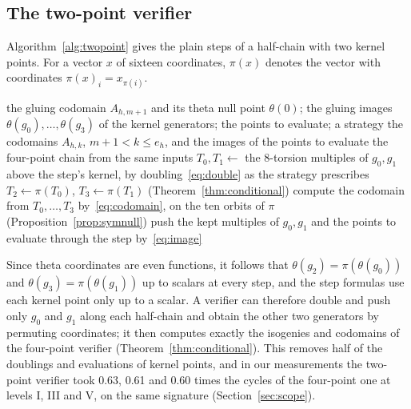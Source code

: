 \documentclass[version=preprint]{iacrcc}
\begin{document}
    \subsection{The two-point verifier}
    \label{sec:twopoint-alg}
    Algorithm~\ref{alg:twopoint} gives the plain steps of a half-chain with
    two kernel points. For a vector $x$ of sixteen coordinates, $\pi(x)$
    denotes the vector with coordinates $\pi(x)_i = x_{\pi(i)}$.

    \begin{algorithm}[t]
        \caption{The plain steps of a half-chain with two kernel points.}
        \label{alg:twopoint}
        \begin{algorithmic}[1]
            \Require the gluing codomain $A_{h,m+1}$ and its theta null point
            $\theta(0)$; the gluing images $\theta(g_0), \ldots, \theta(g_3)$ of
            the kernel generators; the points to evaluate; a strategy
            \Ensure the codomains $A_{h,k}$, $m + 1 < k \le e_h$, and the images
            of the points to evaluate
                \State \Return the four-point chain from the same inputs
            \EndIf
                \State $T_0, T_1 \gets$ the 8-torsion multiples of $g_0, g_1$
                above the step's kernel, by doubling~\eqref{eq:double} as the
                strategy prescribes
                \State $T_2 \gets \pi(T_0)$, $T_3 \gets \pi(T_1)$
                (Theorem~\ref{thm:conditional})
                \State compute the codomain from $T_0, \ldots, T_3$
                by~\eqref{eq:codomain}, on the ten orbits of $\pi$
                (Proposition~\ref{prop:symnull})
                \State push the kept multiples of $g_0, g_1$ and the points to
                evaluate through the step by~\eqref{eq:image}
            \EndFor
        \end{algorithmic}
    \end{algorithm}

    Since theta coordinates are even functions, it follows that $\theta(g_2)
    = \pi(\theta(g_0))$ and $\theta(g_3) = \pi(\theta(g_1))$ up to scalars at
    every step, and the step formulas use each kernel point only up to a
    scalar. A verifier can therefore double and push only $g_0$ and $g_1$
    along each half-chain and obtain the other two generators by permuting
    coordinates; it then computes exactly the isogenies and codomains of the
    four-point verifier (Theorem~\ref{thm:conditional}). This removes half of
    the doublings and evaluations of kernel points, and in our measurements
    the two-point verifier took 0.63, 0.61 and 0.60 times the cycles of the four-point one at levels I, III and V, on
    the same signature (Section~\ref{sec:scope}).
\end{document}
